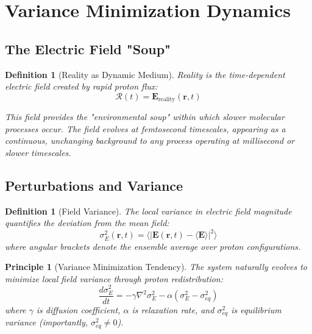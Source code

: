 \documentclass[12pt,a4paper]{article}
\newtheorem{definition}[theorem]{Definition}
\newtheorem{principle}[theorem]{Principle}
\begin{document}
\section{Variance Minimization Dynamics}

\subsection{The Electric Field "Soup"}

\begin{definition}[Reality as Dynamic Medium]
Reality is the time-dependent electric field created by rapid proton flux:
\begin{equation}
\mathcal{R}(t) = \mathbf{E}_{\text{reality}}(\mathbf{r}, t)
\end{equation}

This field provides the "environmental soup" within which slower molecular processes occur. The field evolves at femtosecond timescales, appearing as a continuous, unchanging background to any process operating at millisecond or slower timescales.
\end{definition}

\subsection{Perturbations and Variance}

\begin{definition}[Field Variance]
The local variance in electric field magnitude quantifies the deviation from the mean field:
\begin{equation}
\sigma^2_E(\mathbf{r}, t) = \langle |\mathbf{E}(\mathbf{r}, t) - \langle \mathbf{E} \rangle|^2 \rangle
\end{equation}
where angular brackets denote the ensemble average over proton configurations.
\end{definition}

\begin{principle}[Variance Minimization Tendency]
The system naturally evolves to minimize local field variance through proton redistribution:
\begin{equation}
\frac{d\sigma^2_E}{dt} = -\gamma \nabla^2 \sigma^2_E - \alpha (\sigma^2_E - \sigma^2_{eq})
\end{equation}
where $\gamma$ is diffusion coefficient, $\alpha$ is relaxation rate, and $\sigma^2_{eq}$ is equilibrium variance (importantly, $\sigma^2_{eq} \neq 0$).
\end{principle}
\end{document}
